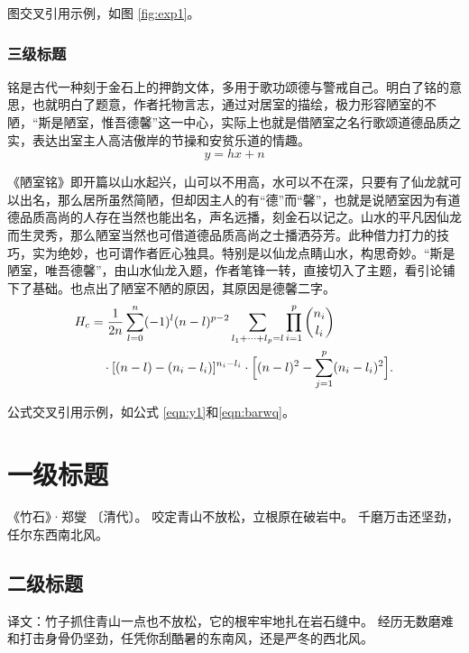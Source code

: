 图交叉引用示例，如图 \ref{fig:exp1}。

\subsubsection{三级标题}

铭是古代一种刻于金石上的押韵文体，多用于歌功颂德与警戒自己。明白了铭的意思，也就明白了题意，作者托物言志，通过对居室的描绘，极力形容陋室的不陋，“斯是陋室，惟吾德馨”这一中心，实际上也就是借陋室之名行歌颂道德品质之实，表达出室主人高洁傲岸的节操和安贫乐道的情趣。
\begin{equation}
    \label{eqn:y1}
    y = hx+n
\end{equation}

《陋室铭》即开篇以山水起兴，山可以不用高，水可以不在深，只要有了仙龙就可以出名，那么居所虽然简陋，但却因主人的有“德”而“馨”，也就是说陋室因为有道德品质高尚的人存在当然也能出名，声名远播，刻金石以记之。山水的平凡因仙龙而生灵秀，那么陋室当然也可借道德品质高尚之士播洒芬芳。此种借力打力的技巧，实为绝妙，也可谓作者匠心独具。特别是以仙龙点睛山水，构思奇妙。“斯是陋室，唯吾德馨”，由山水仙龙入题，作者笔锋一转，直接切入了主题，看引论铺下了基础。也点出了陋室不陋的原因，其原因是德馨二字。
\begin{equation}
    \label{eqn:barwq}
    \begin{split}
        H_c&=\frac{1}{2n} \sum^n_{l=0}(-1)^{l}(n-{l})^{p-2}
        \sum_{l _1+\dots+ l _p=l}\prod^p_{i=1} \binom{n_i}{l _i}\\
        &\quad\cdot[(n-l )-(n_i-l _i)]^{n_i-l _i}\cdot
        \Bigl[(n-l )^2-\sum^p_{j=1}(n_i-l _i)^2\Bigr].
    \end{split}
\end{equation}

公式交叉引用示例，如公式 \eqref{eqn:y1}和\eqref{eqn:barwq}。

\section{一级标题}
《竹石》·郑燮 〔清代〕。
咬定青山不放松，立根原在破岩中。
千磨万击还坚劲，任尔东西南北风。

\subsection{二级标题}
译文：竹子抓住青山一点也不放松，它的根牢牢地扎在岩石缝中。
经历无数磨难和打击身骨仍坚劲，任凭你刮酷暑的东南风，还是严冬的西北风。

